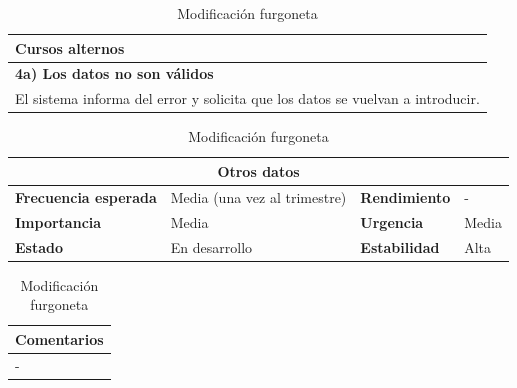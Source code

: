 \documentclass[12pt,spanish]{article}
\begin{document}
\begin{table}[H]
\vspace{1cm}

\begin{tabular}{|m{10pt}|m{7.15cm}|m{10pt}|m{7.15cm}|}
\hline
\multicolumn{4}{|m{16.2cm}|}{\textbf{Cursos alternos}} \\
\hline
\multicolumn{4}{|m{16.2cm}|}{\textbf{4a) Los datos no son válidos}} \\
\hline
\multicolumn{4}{|m{16.2cm}|}{El sistema informa del error y solicita que los datos se vuelvan a introducir.} \\
\hline
\end{tabular}

\vspace{1cm}

\begin{tabular}{|m{3.72cm}|m{3.72cm}|m{3.72cm}|m{3.72cm}|}
\hline
\multicolumn{4}{|c|}{\textbf{Otros datos}} \\
\hline
\textbf{Frecuencia esperada} & Media (una vez al trimestre) & \textbf{Rendimiento} & - \\
\hline
\textbf{Importancia} & Media & \textbf{Urgencia} & Media \\
\hline
\textbf{Estado} & En desarrollo & \textbf{Estabilidad} & Alta \\
\hline
\end{tabular}

\vspace{1cm}

\begin{tabular}{|m{16.2cm}|}
\hline
\textbf{Comentarios} \\
\hline
- \\
\hline
\end{tabular}

\caption{Modificación furgoneta}

\end{table}


\end{document}
